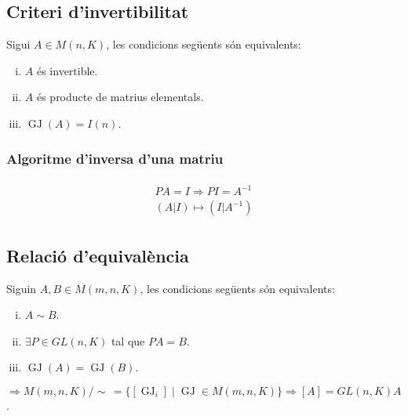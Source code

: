 \subsection{Criteri d'invertibilitat}
Sigui $A \in M (n,K)$, les condicions següents són equivalents:
\begin{enumerate}[i)]
    \item $A$ és invertible.
    \item $A$ és producte de matrius elementals.
    \item $\operatorname{GJ} (A) = I(n)$.
\end{enumerate}
\subsubsection*{Algoritme d'inversa d'una matriu}
\begin{align}
\begin{gathered}
    PA=I \Rightarrow PI = A^{-1} \\
    ( A | I ) \mapsto ( I | A^{-1} )
\end{gathered}
\end{align}

\subsection{Relació d'equivalència}
Siguin $A, B \in M(m,n,K)$, les condicions següents són equivalents:
\begin{enumerate}[i)]
    \item $A \sim B$.
    \item $ \exists P \in GL(n,K)$ tal que $PA = B$.
    \item $\operatorname{GJ} (A) = \operatorname{GJ} (B)$.
\end{enumerate}

$\Rightarrow M(m,n,K)/ \sim \, = \{ [\operatorname{GJ}_{i}] \mid \operatorname{GJ} \in M(m,n,K) \} \Rightarrow [A] = GL(n,K) A$.

